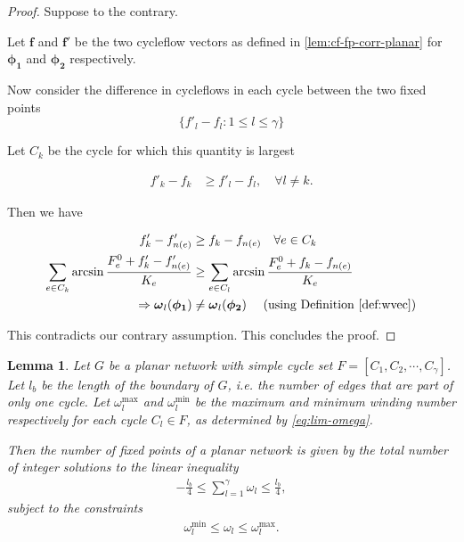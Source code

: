 \documentclass[10pt,aps,pre,preprint,superscriptaddress]{revtex4-1}
\renewcommand{\vec}[1]{\boldsymbol{#1}}
\newtheorem{lemma}{Lemma}
\begin{document}
\begin{proof}
Suppose to the contrary.   

Let $\vec{f}$ and $\vec{f'}$ be the two cycleflow vectors as defined in 
\ref{lem:cf-fp-corr-planar} for $\vec{\phi_1}$ and $\vec{\phi_2}$ 
respectively.   



Now consider the difference in cycleflows in each cycle between the two fixed points
\[
\{f'_l-f_l:1\leq l \leq \gamma\}
\]

Let $C_k$ be the cycle for which this quantity is largest

\begin{align}
\label{}
f'_k-f_k & \geq f'_l-f_l,\quad \forall l\neq k.  
\end{align}

Then we have

\begin{align}
\label{}
f'_k-f'_{n(e)} & \geq f_k-f_{n(e)} \quad\forall e\in C_k\\
\sum_{e\in C_k} \arcsin{\frac{F_e^0+f'_k-f'_{n(e)}}{K_e}} &\geq \sum_{e\in C_l} \arcsin{\frac{F_e^0+f_k-f_{n(e)}}{K_e}}\\
\Rightarrow \vec\omega_l(\vec{\phi_1})&\neq 
\vec\omega_l(\vec{\phi_2})\quad\text{ (using Definition \ref{def:wvec})}
\end{align}

This contradicts our contrary assumption.   
This concludes the proof.  
\end{proof}
 


\begin{lemma}
\label{}
Let $G$ be a planar network with simple cycle set $F=[C_1,C_2,\cdots,C_{\gamma}]$. Let $l_b$ be the length of the \emph{boundary} 
of $G$, i.e. the number of edges that are part of only one cycle.  Let 
$\omega^{\max}_l$ and $\omega^{\min}_l$ be the maximum and minimum winding 
number respectively for each cycle $C_l\in F$, as determined by \eqref{eq:lim-omega}.

Then the number of fixed points of a planar network is given by the total number of 
integer solutions to the linear inequality
\begin{align}
\label{}
-\frac{l_b}{4} \leq \sum_{l=1}^{\gamma} \omega_l \leq \frac{l_b}{4},
\end{align}
subject to the constraints
\begin{align}
\label{}
\omega^{\min}_l \leq \omega_l \leq \omega^{\max}_l.  
\end{align}
\end{lemma}
\end{document}
